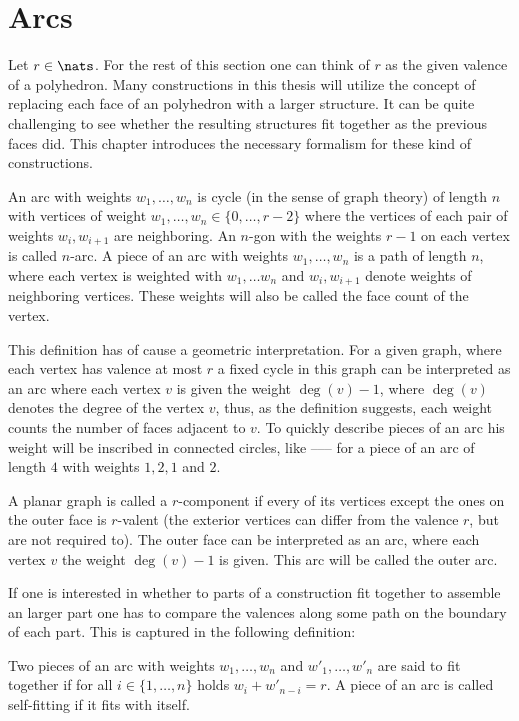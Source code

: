 \section{Arcs}

Let $r \in \nats$. For the rest of this section one can think of $r$ as the given valence of a polyhedron. Many constructions in this thesis will utilize the concept of replacing each face of an polyhedron with a larger structure. It can be quite challenging to see whether the resulting structures fit together as the previous faces did. This chapter introduces the necessary formalism for these kind of constructions.

\begin{definition}[Arc]
  An arc with weights $w_1, \dots, w_n$ is cycle (in the sense of graph theory) of length $n$ with vertices of weight $w_1, \dots, w_n \in \{0, \dots, r - 2\}$ where the vertices of each pair of weights $w_i, w_{i+1}$ are neighboring. An $n$-gon with the weights $r-1$ on each vertex is called $n$-arc. A piece of an arc with weights $w_1, \dots, w_n$ is a path of length $n$, where each vertex is weighted with $w_1, \dots w_n$ and $w_i, w_{i+1}$ denote weights of neighboring vertices. These weights will also be called the face count of the vertex. 
\end{definition}

This definition has of cause a geometric interpretation. For a given graph, where each vertex has valence at most $r$ a fixed cycle in this graph can be interpreted as an arc where each vertex $v$ is given the weight $\deg (v) - 1$, where $\deg (v)$ denotes the degree of the vertex $v$, thus, as the definition suggests, each weight counts the number of faces adjacent to $v$. To quickly describe pieces of an arc his weight will be inscribed in connected circles, like  ------ for a piece of an arc of length $4$ with weights $1, 2, 1$ and $2$.
\begin{definition}
  A planar graph is called a $r$-component if every of its vertices except the ones on the outer face is $r$-valent (the exterior vertices can differ from the valence $r$, but are not required to). The outer face can be interpreted as an arc, where each vertex $v$ the weight $\deg(v) - 1$ is given. This arc will be called the outer arc.
\end{definition}

If one is interested in whether to parts of a construction fit together to assemble an larger part one has to compare the valences along some path on the boundary of each part. This is captured in the following definition:
\begin{definition}
  Two pieces of an arc with weights $w_1, \dots, w_{n}$ and $w'_1, \dots, w'_{n}$ are said to fit together if for all $i \in \{1, \dots, n \}$ holds $w_i + w'_{n-i} = r$. A piece of an arc is called self-fitting if it fits with itself.
\end{definition}


